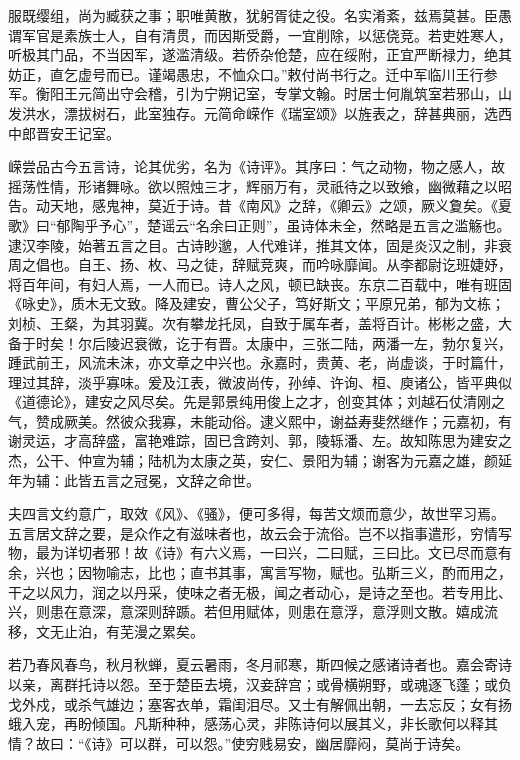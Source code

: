 \documentclass[12pt,UTF8]{ctexbook}
\begin{document}
服既缨组，尚为臧获之事；职唯黄散，犹躬胥徒之役。名实淆紊，兹焉莫甚。臣愚谓军官是素族士人，自有清贯，而因斯受爵，一宜削除，以惩侥竞。若吏姓寒人，听极其门品，不当因军，遂滥清级。若侨杂伧楚，应在绥附，正宜严断禄力，绝其妨正，直乞虚号而已。谨竭愚忠，不恤众口。”敕付尚书行之。迁中军临川王行参军。衡阳王元简出守会稽，引为宁朔记室，专掌文翰。时居士何胤筑室若邪山，山发洪水，漂拔树石，此室独存。元简命嵘作《瑞室颂》以旌表之，辞甚典丽，选西中郎晋安王记室。

嵘尝品古今五言诗，论其优劣，名为《诗评》。其序曰：气之动物，物之感人，故摇荡性情，形诸舞咏。欲以照烛三才，辉丽万有，灵祇待之以致飨，幽微藉之以昭告。动天地，感鬼神，莫近于诗。昔《南风》之辞，《卿云》之颂，厥义夐矣。《夏歌》曰“郁陶乎予心”，楚谣云“名余曰正则”，虽诗体未全，然略是五言之滥觞也。逮汉李陵，始著五言之目。古诗眇邈，人代难详，推其文体，固是炎汉之制，非衰周之倡也。自王、扬、枚、马之徒，辞赋竞爽，而吟咏靡闻。从李都尉讫班婕妤，将百年间，有妇人焉，一人而已。诗人之风，顿已缺丧。东京二百载中，唯有班固《咏史》，质木无文致。降及建安，曹公父子，笃好斯文；平原兄弟，郁为文栋；刘桢、王粲，为其羽冀。次有攀龙托凤，自致于属车者，盖将百计。彬彬之盛，大备于时矣！尔后陵迟衰微，讫于有晋。太康中，三张二陆，两潘一左，勃尔复兴，踵武前王，风流未沫，亦文章之中兴也。永嘉时，贵黄、老，尚虚谈，于时篇什，理过其辞，淡乎寡味。爰及江表，微波尚传，孙绰、许询、桓、庾诸公，皆平典似《道德论》，建安之风尽矣。先是郭景纯用俊上之才，创变其体；刘越石仗清刚之气，赞成厥美。然彼众我寡，未能动俗。逮义熙中，谢益寿斐然继作；元嘉初，有谢灵运，才高辞盛，富艳难踪，固已含跨刘、郭，陵轹潘、左。故知陈思为建安之杰，公干、仲宣为辅；陆机为太康之英，安仁、景阳为辅；谢客为元嘉之雄，颜延年为辅：此皆五言之冠冕，文辞之命世。

夫四言文约意广，取效《风》、《骚》，便可多得，每苦文烦而意少，故世罕习焉。五言居文辞之要，是众作之有滋味者也，故云会于流俗。岂不以指事遣形，穷情写物，最为详切者邪！故《诗》有六义焉，一曰兴，二曰赋，三曰比。文已尽而意有余，兴也；因物喻志，比也；直书其事，寓言写物，赋也。弘斯三义，酌而用之，干之以风力，润之以丹采，使味之者无极，闻之者动心，是诗之至也。若专用比、兴，则患在意深，意深则辞踬。若但用赋体，则患在意浮，意浮则文散。嬉成流移，文无止泊，有芜漫之累矣。

若乃春风春鸟，秋月秋蝉，夏云暑雨，冬月祁寒，斯四候之感诸诗者也。嘉会寄诗以亲，离群托诗以怨。至于楚臣去境，汉妾辞宫；或骨横朔野，或魂逐飞蓬；或负戈外戍，或杀气雄边；塞客衣单，霜闺泪尽。又士有解佩出朝，一去忘反；女有扬蛾入宠，再盼倾国。凡斯种种，感荡心灵，非陈诗何以展其义，非长歌何以释其情？故曰：“《诗》可以群，可以怨。”使穷贱易安，幽居靡闷，莫尚于诗矣。
\end{document}
